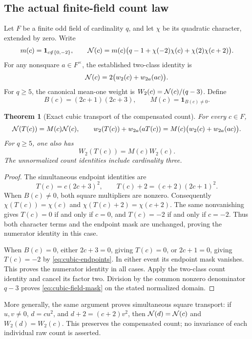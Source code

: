 \documentclass[11pt]{article}
\newtheorem{theorem}{Theorem}[section]
\begin{document}
\subsection{The actual finite-field count law}

Let \(F\) be a finite odd field of cardinality \(q\), and let \(\chi\)
be its quadratic character, extended by zero. Write
\[
 m(c)=\mathbf1_{c\notin\{0,-2\}},\qquad
 {\cal N}(c)=m(c)\bigl(q-1+\chi(-2)\chi(c)+\chi(2)\chi(c+2)\bigr).
\]
For any nonsquare \(a\in F^\times\), the established two-class identity is
\[
 {\cal N}(c)=2\bigl(w_2(c)+w_{2a}(ac)\bigr).
\]
For \(q\ge5\), the canonical mean-one weight is
\(W_2(c)={\cal N}(c)/(q-3)\).
Define
\[
 B(c)=(2c+1)(2c+3),\qquad
 M(c)=\mathbf1_{B(c)\ne0}.
\]

\begin{theorem}[Exact cubic transport of the compensated count]
\label{thm:cubic-count-transport}
For every \(c\in F\),
\[
 {\cal N}(T(c))=M(c){\cal N}(c),\qquad
 w_2(T(c))+w_{2a}(aT(c))
 =M(c)\bigl(w_2(c)+w_{2a}(ac)\bigr).
\]
For \(q\ge5\), one also has
\[
 \boxed{W_2(T(c))=M(c)W_2(c).}
 \tag{C1}\label{eq:cubic-field-mask}
\]
The unnormalized count identities include cardinality three.
\end{theorem}
\begin{proof}
The simultaneous endpoint identities are
\[
 T(c)=c(2c+3)^2,\qquad
 T(c)+2=(c+2)(2c+1)^2.
 \tag{C2}\label{eq:cubic-endpoints}
\]
When \(B(c)\ne0\), both square multipliers are nonzero.
Consequently
\(\chi(T(c))=\chi(c)\) and
\(\chi(T(c)+2)=\chi(c+2)\).
The same nonvanishing gives
\(T(c)=0\) if and only if \(c=0\), and
\(T(c)=-2\) if and only if \(c=-2\).
Thus both character terms and the endpoint mask are unchanged, proving
the numerator identity in this case.

When \(B(c)=0\), either \(2c+3=0\), giving \(T(c)=0\), or
\(2c+1=0\), giving \(T(c)=-2\) by
\eqref{eq:cubic-endpoints}. In either event its endpoint mask vanishes.
This proves the numerator identity in all cases.
Apply the two-class count identity and cancel its factor two.
Division by the common nonzero denominator \(q-3\) proves
\eqref{eq:cubic-field-mask} on the stated normalized domain.
\end{proof}

More generally, the same argument proves simultaneous square transport:
if \(u,v\ne0\), \(d=cu^2\), and \(d+2=(c+2)v^2\), then
\({\cal N}(d)={\cal N}(c)\) and \(W_2(d)=W_2(c)\).
This preserves the compensated count; no invariance of each individual
raw count is asserted.
\end{document}

